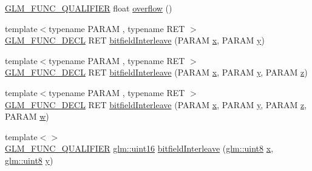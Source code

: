 \begin{DoxyCompactItemize}
\mbox{\hyperlink{setup_8hpp_a33fdea6f91c5f834105f7415e2a64407}{G\+L\+M\+\_\+\+F\+U\+N\+C\+\_\+\+Q\+U\+A\+L\+I\+F\+I\+ER}} float \mbox{\hyperlink{namespaceglm_1_1detail_a61efe122333bc00e81c57e0927bfdfb3}{overflow}} ()
\item 
{\footnotesize template$<$typename P\+A\+R\+AM , typename R\+ET $>$ }\\\mbox{\hyperlink{setup_8hpp_ab2d052de21a70539923e9bcbf6e83a51}{G\+L\+M\+\_\+\+F\+U\+N\+C\+\_\+\+D\+E\+CL}} R\+ET \mbox{\hyperlink{namespaceglm_1_1detail_a39644ee418ae41e3393d1cb6191e32a7}{bitfield\+Interleave}} (P\+A\+R\+AM \mbox{\hyperlink{glad_8h_a92d0386e5c19fb81ea88c9f99644ab1d}{x}}, P\+A\+R\+AM \mbox{\hyperlink{glad_8h_a66ddd433d2cacfe27f5906b7e86faeed}{y}})
\item 
{\footnotesize template$<$typename P\+A\+R\+AM , typename R\+ET $>$ }\\\mbox{\hyperlink{setup_8hpp_ab2d052de21a70539923e9bcbf6e83a51}{G\+L\+M\+\_\+\+F\+U\+N\+C\+\_\+\+D\+E\+CL}} R\+ET \mbox{\hyperlink{namespaceglm_1_1detail_aa2fdd8f720417a13990873ba704a3426}{bitfield\+Interleave}} (P\+A\+R\+AM \mbox{\hyperlink{glad_8h_a92d0386e5c19fb81ea88c9f99644ab1d}{x}}, P\+A\+R\+AM \mbox{\hyperlink{glad_8h_a66ddd433d2cacfe27f5906b7e86faeed}{y}}, P\+A\+R\+AM \mbox{\hyperlink{glad_8h_acb78bf1972d3eaf07da34ff2e0a2f133}{z}})
\item 
{\footnotesize template$<$typename P\+A\+R\+AM , typename R\+ET $>$ }\\\mbox{\hyperlink{setup_8hpp_ab2d052de21a70539923e9bcbf6e83a51}{G\+L\+M\+\_\+\+F\+U\+N\+C\+\_\+\+D\+E\+CL}} R\+ET \mbox{\hyperlink{namespaceglm_1_1detail_a606f6dc8c8314159fafef68f820c2c65}{bitfield\+Interleave}} (P\+A\+R\+AM \mbox{\hyperlink{glad_8h_a92d0386e5c19fb81ea88c9f99644ab1d}{x}}, P\+A\+R\+AM \mbox{\hyperlink{glad_8h_a66ddd433d2cacfe27f5906b7e86faeed}{y}}, P\+A\+R\+AM \mbox{\hyperlink{glad_8h_acb78bf1972d3eaf07da34ff2e0a2f133}{z}}, P\+A\+R\+AM \mbox{\hyperlink{glad_8h_a1d0296e9e835f2e1ee17634af95fc1ec}{w}})
\item 
{\footnotesize template$<$$>$ }\\\mbox{\hyperlink{setup_8hpp_a33fdea6f91c5f834105f7415e2a64407}{G\+L\+M\+\_\+\+F\+U\+N\+C\+\_\+\+Q\+U\+A\+L\+I\+F\+I\+ER}} \mbox{\hyperlink{group__gtc__type__precision_gad8c2939e1fdd8e5828b31d95c52255d5}{glm\+::uint16}} \mbox{\hyperlink{namespaceglm_1_1detail_ac59c574dc7900d87786f5a96f82ea6e7}{bitfield\+Interleave}} (\mbox{\hyperlink{group__gtc__type__precision_ga1a7dcd8aac97cc8020817c94049deff2}{glm\+::uint8}} \mbox{\hyperlink{glad_8h_a92d0386e5c19fb81ea88c9f99644ab1d}{x}}, \mbox{\hyperlink{group__gtc__type__precision_ga1a7dcd8aac97cc8020817c94049deff2}{glm\+::uint8}} \mbox{\hyperlink{glad_8h_a66ddd433d2cacfe27f5906b7e86faeed}{y}})

\end{DoxyCompactItemize}
